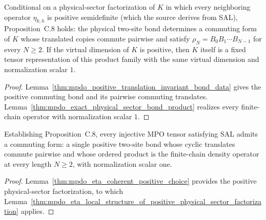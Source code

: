 \begin{lemma}
    \label{thm:mpdo_eta_local_structure_of_positive_physical_sector_factorization}
    \leanok
    Conditional on a physical-sector factorization of $K$ in which every
    neighboring operator $\eta_{k,h}$ is positive semidefinite (which the
    source derives from SAL), Proposition~C.8 holds: the physical two-site bond
    determines a commuting form of $K$ whose translated copies
    commute pairwise and satisfy
    $\rho_N=B_0B_1\cdots B_{N-1}$ for every $N\geq2$.
    If the virtual dimension of $K$ is positive, then $K$ itself is a fixed
    tensor representation of this product family with the same virtual
    dimension and normalization scalar $1$.
\end{lemma}

\begin{proof}
    \leanok
    Lemma~\ref{thm:mpdo_positive_translation_invariant_bond_data} gives the
    positive commuting bond and its pairwise commuting
    translates. Lemma~\ref{thm:mpdo_exact_physical_sector_bond_product}
    realizes every finite-chain operator with normalization scalar $1$.
\end{proof}

\begin{theorem}%
    \label{cor:mpdo_eta_local_structure_of_is_sal}
    \leanok
    Establishing Proposition~C.8, every injective MPO tensor satisfying SAL
    admits a commuting form: a single positive two-site bond whose
    cyclic translates commute pairwise and whose ordered product is the
    finite-chain density operator at every length $N\geq2$, with normalization
    scalar one.
\end{theorem}

\begin{proof}
    \leanok
    Lemma~\ref{thm:mpdo_eta_coherent_positive_choice} provides the positive
    physical-sector factorization, to which
    Lemma~\ref{thm:mpdo_eta_local_structure_of_positive_physical_sector_factorization}
    applies.
\end{proof}

